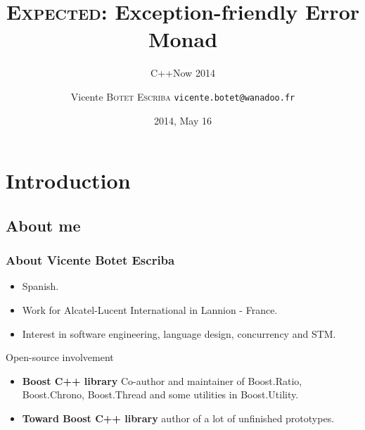 \documentclass[xcolor=dvipsnames]{beamer}
\title{\textsc{Expected}: Exception-friendly Error Monad}
\subtitle{C++Now 2014}
\author[\textsc{Vicente Botet}]{Vicente \textsc{Botet Escriba} \texttt{vicente.botet@wanadoo.fr}}
\institute[Alcatel-Lucent]{Alcatel-Lucent International-Lannion}
\date[]{2014, May 16}
\begin{document}
\maketitle

\section{Introduction}

\subsection{About me}

\begin{frame}
\frametitle{About Vicente Botet Escriba}


\begin{itemize}
\item Spanish.
\item Work for Alcatel-Lucent International in Lannion - France.
\item Interest in software engineering, language design, concurrency and STM.
\end{itemize}

\begin{block}{Open-source involvement}
\begin{itemize}
\item \textbf{Boost C++ library} Co-author and maintainer of Boost.Ratio, Boost.Chrono, Boost.Thread and some utilities in Boost.Utility.
\item \textbf{Toward Boost C++ library} author of a lot of unfinished prototypes.
\end{itemize}
\end{block}
\end{frame}
\end{document}
